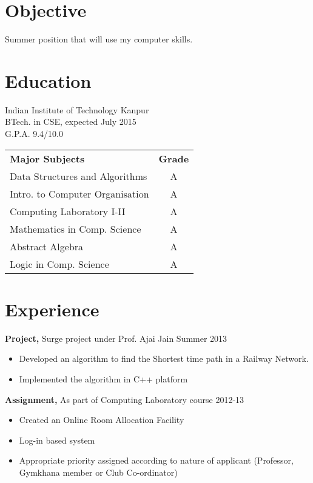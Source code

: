 \documentclass[margin]{res}
\begin{document}
 
\begin{resume} 
 
\section{Objective} 
Summer position that will use my computer skills.

\section{Education} 
Indian Institute of Technology Kanpur\\
                BTech. in CSE, expected July 2015 \\
                G.P.A. 9.4/10.0 
 
                \begin{tabular}{ l c }
               
                {\bf Major Subjects}   &  {\bf Grade} \\
                Data Structures and Algorithms           &  A \\
                Intro. to Computer Organisation &  A \\
                Computing Laboratory I-II        & A \\
                Mathematics in Comp. Science  & A \\
                Abstract Algebra   &  A \\
                Logic in Comp. Science &  A\\
		\end{tabular}

\section{Experience}
{\bf Project,} Surge project under Prof. Ajai Jain \hfill
Summer 2013                
                \begin{itemize} \itemsep -2pt
                 \item Developed an algorithm to find the Shortest time path in a Railway Network.
                
                 \item Implemented the algorithm in C++ platform

		 \end{itemize}
		 
{\bf Assignment,} As part of Computing Laboratory course \hfill  2012-13
\begin{itemize} \itemsep -2pt %
\item Created an Online Room Allocation Facility
\item Log-in based system
\item Appropriate priority assigned according to nature of applicant (Professor, Gymkhana member or Club Co-ordinator)
\end{itemize}




\end{resume}
\end{document}
